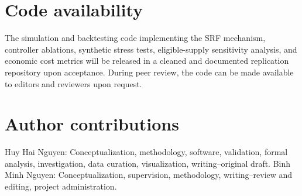 \documentclass[a4paper,fleqn]{cas-dc}
\begin{document}
\section*{Code availability}

The simulation and backtesting code implementing the SRF mechanism, controller ablations, synthetic stress tests, eligible-supply sensitivity analysis, and economic cost metrics will be released in a cleaned and documented replication repository upon acceptance. During peer review, the code can be made available to editors and reviewers upon request.

\section*{Author contributions}

Huy Hai Nguyen: Conceptualization, methodology, software, validation, formal analysis, investigation, data curation, visualization, writing--original draft. Binh Minh Nguyen: Conceptualization, supervision, methodology, writing--review and editing, project administration.





\end{document}
